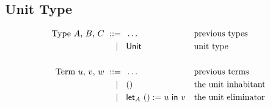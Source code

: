 \subsection{Unit Type}
\label{sec:unit-type}

\begin{align*}
  \text{Type $A$, $B$, $C$}
    \ \mathrel{{:}{:}{=}}\    {}& \ldots                   && \text{previous types}\\
    \ \mid\ \  {}& \mathsf{Unit}                    && \text{unit type} \\
  \\
  \text{Term $u$, $v$, $w$}
    \ \mathrel{{:}{:}{=}}\    {}& \ldots                   && \text{previous terms} \\
    \ \mid\ \  {}& \mathsf{()}                    && \text{the unit inhabitant} \\
    \ \mid\ \  {}& \mathsf{let}_{A}\ \mathsf{()} := u\ \mathsf{in}\  v       && \text{the unit eliminator}
\end{align*}

\newcommand{\rlTyUnit}{\referTo{ty-unit}{rul:ty-unit}}
\newcommand{\showTyUnit}{%
  \infer[\rulename{ty-unit}] %
  {\isctx{\G}}
  {\istype{\G}{\Unit}}
}

\newcommand{\rlTermUnit}{\referTo{term-unit}{rul:term-unit}}
\newcommand{\showTermUnit}{%
  \infer[\rulename{term-unit}] %
  {\isctx{\G}}
  {\isterm{\G}{\unit}{\Unit}}
}

\newcommand{\rlTermLet}{\referTo{term-let}{rul:term-let}}
\newcommand{\showTermLet}{%
  \infer[\rulename{term-let}] %
  {\istype{\ctxextend{\G}{\Unit}}{\A} \\
   \isterm{\G}{\uu}{\Unit} \\
   \isterm{\G}{\vv}{\subst{\A}{\sbzero{\G}{\Unit}{\unit}}}}
  {\isterm{\G}{\ulet{\A}{\uu} \vv}{\subst{\A}{\sbzero{\G}{\Unit}{\uu}}}}
}

\newcommand{\rlEqTySubstUnit}{\referTo{eq-ty-subst-unit}{rul:eq-ty-subst-unit}}
\newcommand{\showEqTySubstUnit}{%
  \infer[\rulename{eq-ty-subst-unit}] %
  {\issubst{\sbs}{\G}{\D}}
  {\eqtype{\G}{\subst{\Unit}{\sbs}}{\Unit}}
}

\newcommand{\rlEqSubstUnit}{\referTo{eq-subst-unit}{rul:eq-subst-unit}}
\newcommand{\showEqSubstUnit}{%
  \infer[\rulename{eq-subst-unit}] %
  {\issubst{\sbs}{\G}{\D}}
  {\eqterm{\G}{\subst{\unit}{\sbs}}{\unit}{\Unit}}
}

\newcommand{\rlEqSubstLet}{\referTo{eq-subst-let}{rul:eq-subst-let}}
\newcommand{\showEqSubstLet}{%
  \infer[\rulename{eq-subst-let}] %
  {\issubst{\sbs}{\G}{\D} \\
   \istype{\ctxextend{\D}{\Unit}}{\A} \\
   \isterm{\D}{\uu}{\Unit} \\
   \isterm{\D}{\vv}{\subst{\A}{\sbzero{\D}{\Unit}{\unit}}}}
  {\eqterm{\G}
    {\subst{(\ulet{\A}{\uu} \vv)}{\sbs}}
    {\ulet
      {\subst{\A}{\sbshift{\G}{\Unit}{\sbs}}}
      {\subst{\uu}{\sbs}}
      \subst{\vv}{\sbs}
    }
    {\subst{\subst{\A}{\sbzero{\D}{\Unit}{\uu}}}}{\sbs}}
}

